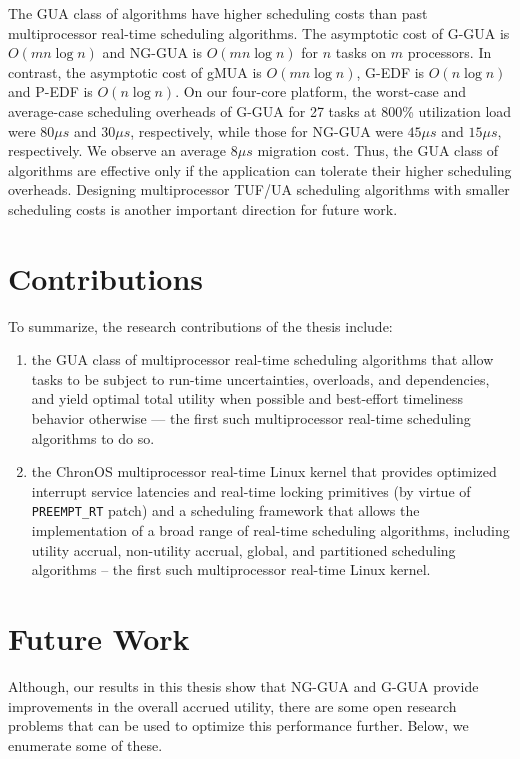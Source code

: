 \documentclass[12pt,dvips]{report}
\begin{document}
The GUA class of algorithms have higher scheduling costs than past multiprocessor real-time scheduling algorithms. The asymptotic cost of G-GUA is $O(m n\log n)$ and NG-GUA is $O(m n\log n)$ for $n$ tasks on $m$ processors. In contrast, the asymptotic cost of gMUA is $O(m n \log n)$, G-EDF is $O(n \log n)$ and P-EDF is $O(n \log n)$. On our four-core platform, the worst-case and average-case scheduling overheads of G-GUA for 27 tasks at 800\% utilization load were $80 \mu s$ and $30 \mu s$, respectively, while those for NG-GUA were $45 \mu s$ and $15 \mu s$, respectively. We observe an average $8 \mu s$ migration cost. Thus, the GUA class of algorithms are effective only if the application can tolerate their higher scheduling overheads. Designing multiprocessor TUF/UA scheduling algorithms with smaller scheduling costs is another important direction for future work.

\section{Contributions}

To summarize, the research contributions of the thesis include:
\begin{enumerate}
	\item the GUA class of multiprocessor real-time scheduling algorithms that allow tasks to be subject to run-time uncertainties, overloads, and dependencies, and yield optimal total utility when possible and best-effort timeliness behavior otherwise --- the first such multiprocessor real-time scheduling algorithms to do so.
	\item the ChronOS multiprocessor real-time Linux kernel that provides optimized interrupt service latencies and real-time locking primitives (by virtue of \texttt{PREEMPT\_RT} patch) and a scheduling framework that allows the implementation of a broad range of real-time scheduling algorithms, including utility accrual, non-utility accrual, global, and partitioned scheduling algorithms -- the first such multiprocessor real-time Linux kernel.
\end{enumerate}


\section{Future Work}

Although, our results in this thesis show that NG-GUA and G-GUA provide improvements in the overall accrued utility, there are some open research problems that can be used to optimize this performance further. Below, we enumerate some of these.
\end{document}

